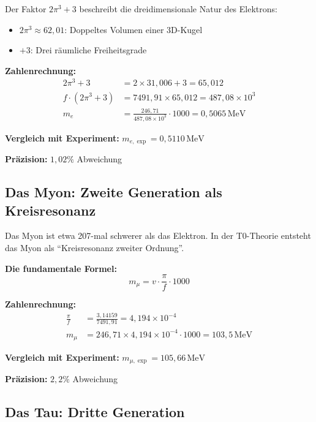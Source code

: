 	Der Faktor \(2\pi^3 + 3\) beschreibt die dreidimensionale Natur des Elektrons:
	\begin{itemize}
		\item \(2\pi^3 \approx 62{,}01\): Doppeltes Volumen einer 3D-Kugel
		\item \(+3\): Drei räumliche Freiheitsgrade
	\end{itemize}
	
	\textbf{Zahlenrechnung:}
	\begin{align}
		2\pi^3 + 3 &= 2 \times 31{,}006 + 3 = 65{,}012 \\
		f \cdot (2\pi^3 + 3) &= 7491{,}91 \times 65{,}012 = 487{,}08 \times 10^{3} \\
		m_e &= \frac{246{,}71}{487{,}08 \times 10^{3}} \cdot 1000 = 0{,}5065\,\text{MeV}
	\end{align}
	
	\textbf{Vergleich mit Experiment:} \(m_{e,\exp} = 0{,}5110\,\text{MeV}\)
	
	\textbf{Präzision:} \(1{,}02\%\) Abweichung
	
	\subsection{Das Myon: Zweite Generation als Kreisresonanz}
	
	Das Myon ist etwa 207-mal schwerer als das Elektron. In der T0-Theorie entsteht das Myon als \enquote{Kreisresonanz zweiter Ordnung}.
	
	\textbf{Die fundamentale Formel:}
	\begin{equation}
		\boxed{m_\mu = v \cdot \frac{\pi}{f} \cdot 1000}
	\end{equation}
	
	\textbf{Zahlenrechnung:}
	\begin{align}
		\frac{\pi}{f} &= \frac{3{,}14159}{7491{,}91} = 4{,}194 \times 10^{-4} \\
		m_\mu &= 246{,}71 \times 4{,}194 \times 10^{-4} \cdot 1000 = 103{,}5\,\text{MeV}
	\end{align}
	
	\textbf{Vergleich mit Experiment:} \(m_{\mu,\exp} = 105{,}66\,\text{MeV}\)
	
	\textbf{Präzision:} \(2{,}2\%\) Abweichung
	
	\subsection{Das Tau: Dritte Generation}
	
